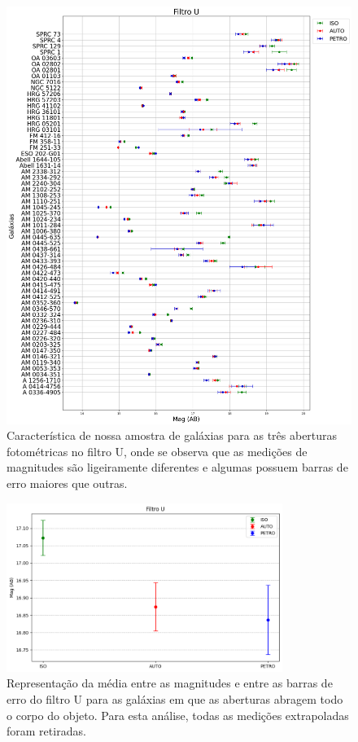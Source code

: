 \begin{figure}[!h]
  \centering 
  \includegraphics[width=1.0\textwidth]{Imagens/galaxias_vertical.png}
  \caption[Nossa amostra vista no filtro U para as três aberturas fotométricas.]{Característica de nossa amostra de galáxias para as três aberturas fotométricas no filtro U, onde se observa que as medições de magnitudes são ligeiramente diferentes e algumas possuem barras de erro maiores que outras.}
  \label{fig:galaxias} 
\end{figure}

\begin{figure}[h]
  \centering 
  \includegraphics[width=0.8\textwidth]{Imagens/incerteza_abertura.png} 
  \caption[Média entre as três aberturas e seus respectivos erros para o filtro U.]{Representação da média entre as magnitudes e entre as barras de erro do filtro U para as galáxias em que as aberturas abragem todo o corpo do objeto. Para esta análise, todas as medições extrapoladas foram retiradas.}
  \label{fig:incerteza_abertura} 
\end{figure}

